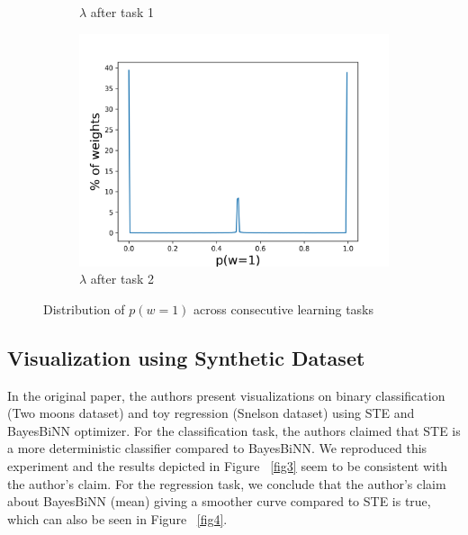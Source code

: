 \begin{figure}[h]
\begin{subfigure}[b]{0.3\textwidth}
         \caption{$\lambda$ after task 1}
     \end{subfigure}
     \hfill
     \begin{subfigure}[b]{0.3\textwidth}
         \centering
         \includegraphics[width=1.1\textwidth]{../openreview/figs/after_task_2.png}
         \caption{$\lambda$ after task 2}
     \end{subfigure}
        \caption{Distribution of $p(w=1)$ across consecutive learning tasks}
\end{figure}

\subsection{Visualization using Synthetic Dataset}

In the original paper, the authors present visualizations on binary classification (Two moons dataset\cite{r10}) and toy regression (Snelson dataset\cite{r9}) using STE and BayesBiNN optimizer. For the classification task, the authors claimed that STE is a more deterministic classifier compared to BayesBiNN. We reproduced this experiment and the results depicted in Figure ~\ref{fig3} seem to be consistent with the author's claim. For the regression task, we conclude that the author's claim about BayesBiNN (mean) giving a smoother curve compared to STE is true, which can also be seen in Figure ~\ref{fig4}. 






